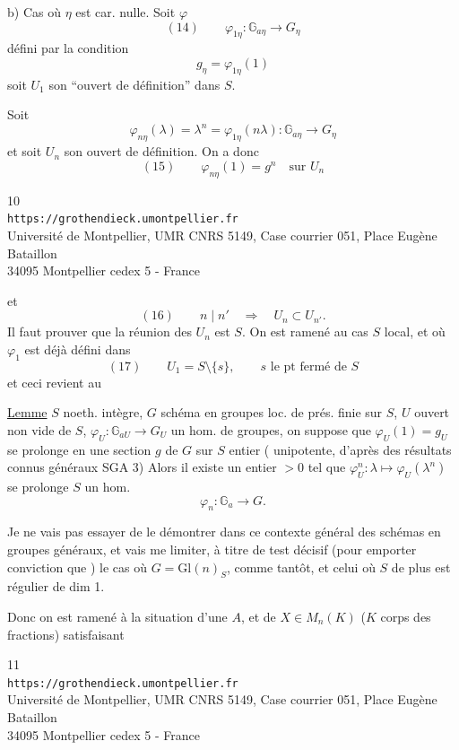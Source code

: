 b) Cas où $\eta$ est car. nulle. Soit $\varphi$
\[
(14)\qquad \varphi_{1\eta}:\mathbb G_{a\eta}\longrightarrow G_\eta
\]
défini par la condition
\[
g_\eta=\varphi_{1\eta}(1)
\]
soit $U_1$ son ``ouvert de définition'' dans $S$.

Soit
\[
\varphi_{n\eta}(\lambda)=\lambda^n=\varphi_{1\eta}(n\lambda):\mathbb G_{a\eta}\longrightarrow G_\eta
\]
et soit $U_n$ son ouvert de définition. On a donc
\[
(15)\qquad\varphi_{n\eta}(1)=g^n\quad\text{sur }U_n
\]

\begin{center}
\small
10\\
\texttt{https://grothendieck.umontpellier.fr}\\
Université de Montpellier, UMR CNRS 5149, Case courrier 051, Place Eugène Bataillon\\
34095 Montpellier cedex 5 - France
\end{center}

et
\[
(16)\qquad n\mid n'\quad\Longrightarrow\quad U_n\subset U_{n'}.
\]
Il faut prouver que la réunion des $U_n$ est $S$. On est ramené au cas $S$ local, et où $\varphi_1$ est déjà défini dans
\[
(17)\qquad U_1=S\setminus\{s\},\qquad s\text{ le pt fermé de }S
\]
et ceci revient au

\uline{Lemme}   $S$ noeth. intègre, $G$ schéma en groupes  loc. de prés. finie sur $S$, $U$ ouvert non vide de $S$, $\varphi_U:\mathbb G_{aU}\longrightarrow G_U$ un hom. de groupes, on suppose que $\varphi_U(1)=g_U$ se prolonge en une section $g$ de $G$ sur $S$  entier ( unipotente, d'après des résultats connus généraux  SGA 3) Alors il existe un entier $>0$ tel que $\varphi_U^n:\lambda\longmapsto\varphi_U(\lambda^n)$ se prolonge  $S$ un hom.
\[
\varphi_n:\mathbb G_a\longrightarrow G.
\]

Je ne vais pas essayer de le démontrer dans ce contexte général des schémas en groupes généraux, et vais me limiter, à titre de test décisif (pour emporter conviction que ) le cas où $G=\mathrm{Gl}(n)_S$, comme tantôt, et celui où $S$ de plus est régulier de dim 1.

Donc on est ramené à la situation d'une  $A$, et de $X\in M_n(K)$ ($K$ corps des fractions) satisfaisant

\begin{center}
\small
11\\
\texttt{https://grothendieck.umontpellier.fr}\\
Université de Montpellier, UMR CNRS 5149, Case courrier 051, Place Eugène Bataillon\\
34095 Montpellier cedex 5 - France
\end{center}

